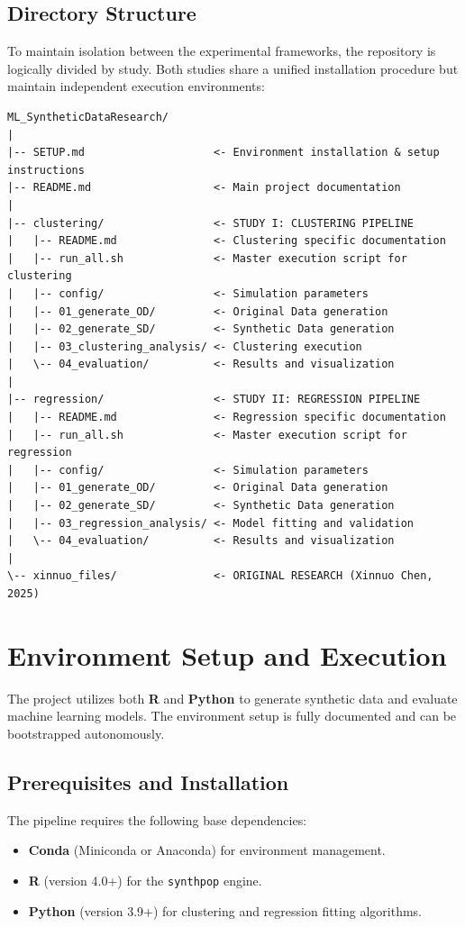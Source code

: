 \subsection{Directory Structure}
To maintain isolation between the experimental frameworks, the repository is logically divided by study. Both studies share a unified installation procedure but maintain independent execution environments:

\begin{verbatim}
ML_SyntheticDataResearch/
|
|-- SETUP.md                    <- Environment installation & setup instructions
|-- README.md                   <- Main project documentation
|
|-- clustering/                 <- STUDY I: CLUSTERING PIPELINE
|   |-- README.md               <- Clustering specific documentation
|   |-- run_all.sh              <- Master execution script for clustering
|   |-- config/                 <- Simulation parameters
|   |-- 01_generate_OD/         <- Original Data generation
|   |-- 02_generate_SD/         <- Synthetic Data generation
|   |-- 03_clustering_analysis/ <- Clustering execution
|   \-- 04_evaluation/          <- Results and visualization
|
|-- regression/                 <- STUDY II: REGRESSION PIPELINE
|   |-- README.md               <- Regression specific documentation
|   |-- run_all.sh              <- Master execution script for regression
|   |-- config/                 <- Simulation parameters
|   |-- 01_generate_OD/         <- Original Data generation
|   |-- 02_generate_SD/         <- Synthetic Data generation
|   |-- 03_regression_analysis/ <- Model fitting and validation
|   \-- 04_evaluation/          <- Results and visualization
|
\-- xinnuo_files/               <- ORIGINAL RESEARCH (Xinnuo Chen, 2025)
\end{verbatim}

\section{Environment Setup and Execution}
\label{sec:app-setup}

The project utilizes both \textbf{R} and \textbf{Python} to generate synthetic data and evaluate machine learning models. The environment setup is fully documented and can be bootstrapped autonomously.

\subsection{Prerequisites and Installation}
The pipeline requires the following base dependencies:
\begin{itemize}
    \item \textbf{Conda} (Miniconda or Anaconda) for environment management.
    \item \textbf{R} (version 4.0+) for the \texttt{synthpop} engine.
    \item \textbf{Python} (version 3.9+) for clustering and regression fitting algorithms.
\end{itemize}

